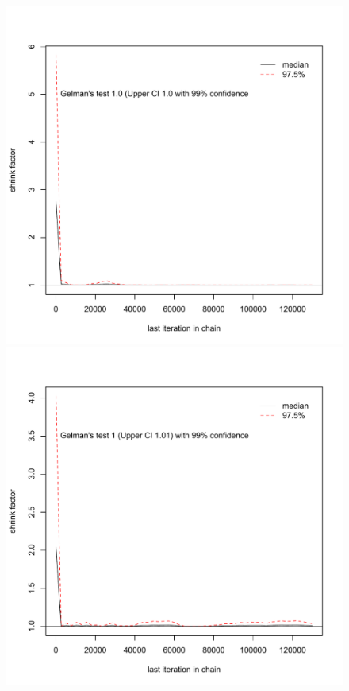 \documentclass[11pt]{article}
\begin{document}
\begin{figure}
    \centering 
      \begin{minipage}[b]{0.33\textwidth}
    \includegraphics[width=\textwidth]{Gelmanbissenodip.pdf} 
    \end{minipage}
    \begin{minipage}[b]{0.33\textwidth}
        \includegraphics[width=\textwidth]{Gelmanhissenodipasym.pdf}

\end{minipage}
\end{figure}
\end{document}
